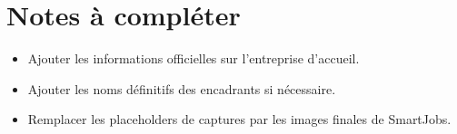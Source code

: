 
\section*{Notes à compléter}

\begin{itemize}
    \item Ajouter les informations officielles sur l'entreprise d'accueil.
    \item Ajouter les noms définitifs des encadrants si nécessaire.
    \item Remplacer les placeholders de captures par les images finales de SmartJobs.
\end{itemize}
